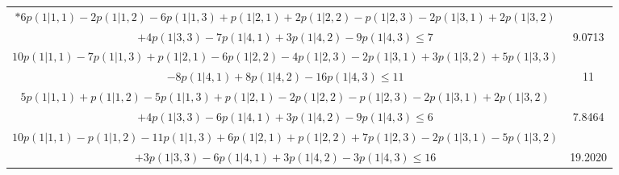 \documentclass[11pt]{article}
\begin{document}
\begin{table}[htbp]
{\begin{tabular}{|c|c|}

      $* 6p(1|1,1) -2p(1|1,2) -6p(1|1,3) +p(1|2,1) +2p(1|2,2) -p(1|2,3) -2p(1|3,1) +2p(1|3,2) $&\\$+4p(1|3,3) -7p(1|4,1) +3p(1|4,2) -9p(1|4,3) \leqslant 7$ & 9.0713 \\ \hline

      $10p(1|1,1) -7p(1|1,3) +p(1|2,1) -6p(1|2,2) -4p(1|2,3) -2p(1|3,1) +3p(1|3,2) +5p(1|3,3) $&\\$-8p(1|4,1) +8p(1|4,2) -16p(1|4,3) \leqslant 11$ & 11\\ \hline

      $5p(1|1,1) +p(1|1,2) -5p(1|1,3) +p(1|2,1) -2p(1|2,2) -p(1|2,3) -2p(1|3,1) +2p(1|3,2)$&\\$ +4p(1|3,3) -6p(1|4,1) +3p(1|4,2) -9p(1|4,3) \leqslant 6$ &  7.8464 \\ \hline

      $10p(1|1,1) -p(1|1,2) -11p(1|1,3) +6p(1|2,1) +p(1|2,2) +7p(1|2,3) -2p(1|3,1) -5p(1|3,2) $&\\$+3p(1|3,3) -6p(1|4,1) +3p(1|4,2) -3p(1|4,3) \leqslant 16$ & 19.2020 \\ \hline

      
    \end{tabular}
}
\end{table}
\end{document}
